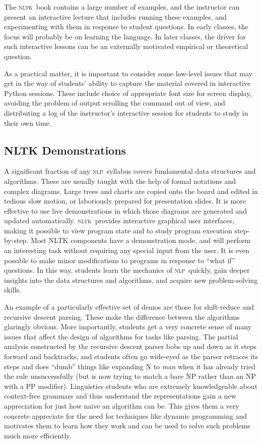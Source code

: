 \documentclass[11pt]{article}
\newcommand{\NLP}{\textsc{nlp}}
\newcommand{\NLTK}{\textsc{nltk}}
\begin{document}
The \NLTK\ book contains a large number of examples, and the instructor
can present an interactive lecture that includes running these examples,
and experimenting with them in response to student questions.  In early
classes, the focus will probably be on learning the language.  In later classes,
the driver for such interactive lessons can be an externally motivated
empirical or theoretical question.

As a practical matter, it is important to consider some low-level issues
that may get in the way of students' ability to capture the material
covered in interactive Python sessions.  These include choice of
appropriate font size for screen display, avoiding the problem of output scrolling the
command out of view, and distributing a log of the instructor's interactive session
for students to study in their own time.


\subsection{NLTK Demonstrations}

A significant fraction of any \NLP\ syllabus covers fundamental data
structures and algorithms. These are usually taught with the help of
formal notations and complex diagrams. Large trees and charts are
copied onto the board and edited in tedious slow motion, or
laboriously prepared for presentation slides. It is more effective to
use live demonstrations in which those diagrams are generated and
updated automatically. \NLTK\ provides interactive graphical user
interfaces, making it possible to view program state and to study
program execution step-by-step. Most NLTK components have a
demonstration mode, and will perform an interesting task without
requiring any special input from the user. It is even possible to make
minor modifications to programs in response to ``what if'' questions. In
this way, students learn the mechanics of \NLP\ quickly, gain deeper
insights into the data structures and algorithms, and acquire new
problem-solving skills.

An example of a particularly effective set of demos are those for
shift-reduce and recursive descent parsing. These make the difference
between the algorithms glaringly obvious. More importantly, students
get a very concrete sense of many issues that affect the design of
algorithms for tasks like parsing. The partial analysis constructed by
the recursive descent parser bobs up and down as it steps forward and
backtracks, and students often go wide-eyed as the parser retraces its
steps and does ``dumb'' things like expanding N to {\it man} when it
has already tried the rule unsuccessfully (but is now trying to match
a bare NP rather than an NP with a PP modifier). Linguistics students
who are extremely knowledgeable about context-free grammars and thus
understand the representations gain a new appreciation for just how
naive an algorithm can be. This gives them a very concrete appreciate
for the need for techniques like dynamic programming and motivates
them to learn how they work and can be used to solve such problems
much more efficiently.
\end{document}
